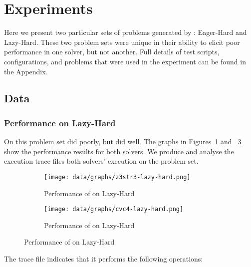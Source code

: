\section{Experiments}

    Here we present two particular sets of problems generated by \fuzzer{}: Eager-Hard and Lazy-Hard. These two problem sets were unique in their ability to elicit poor performance in one solver, but not another. Full details of test scripts, configurations, and problems that were used in the experiment can be found in the Appendix.


    \subsection{Data}

        \subsubsection{Performance on Lazy-Hard}

            On this problem set \cvc{} did poorly, but \us{} did well. The graphs in Figures~\ref{fig:z3str3-lazy-hard} and ~\ref{fig:cvc4-lazy-hard} show the performance results for both solvers. We produce and analyse the execution trace files both solvers' execution on the problem set.

            \begin{figure}[h]
                \begin{subfigure}{.5\textwidth}
                    \texttt{[image: data/graphs/z3str3-lazy-hard.png]}
                    \caption{Performance of \us{} on Lazy-Hard}
                    \label{fig:z3str3-lazy-hard}
                \end{subfigure}
                \begin{subfigure}{.5\textwidth}
                    \texttt{[image: data/graphs/cvc4-lazy-hard.png]}
                    \caption{Performance of \cvc{} on Lazy-Hard}
                    \label{fig:cvc4-lazy-hard}
                \end{subfigure}
            \end{figure}

            The \cvc{} trace file indicates that it performs the following operations:

